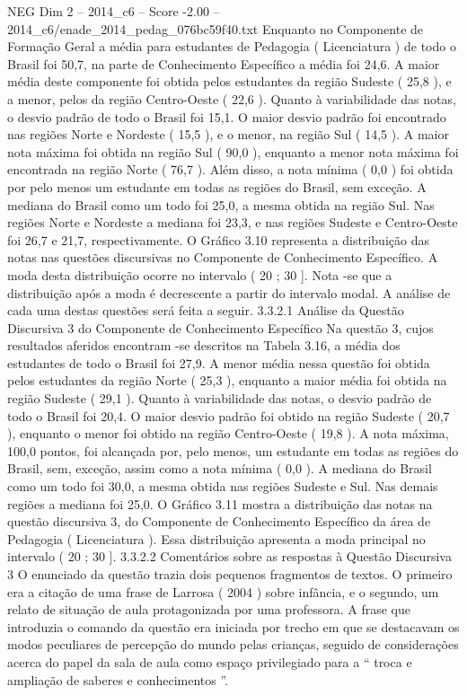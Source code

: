 \begin{textsample}{NEG Dim 2 – 2014\_c6 – Score -2.00 – 2014\_c6/enade\_2014\_pedag\_076bc59f40.txt}
Enquanto no Componente de Formação Geral a média para estudantes de Pedagogia ( Licenciatura ) de todo o Brasil foi 50,7, na parte de Conhecimento Específico a média foi 24,6.
A maior média deste componente foi obtida pelos estudantes da região Sudeste ( 25,8 ), e a menor, pelos da região Centro-Oeste ( 22,6 ).
Quanto à variabilidade das notas, o desvio padrão de todo o Brasil foi 15,1.
O maior desvio padrão foi encontrado nas regiões Norte e Nordeste ( 15,5 ), e o menor, na região Sul ( 14,5 ).
A maior nota máxima foi obtida na região Sul ( 90,0 ), enquanto a menor nota máxima foi encontrada na região Norte ( 76,7 ).
Além disso, a nota mínima ( 0,0 ) foi obtida por pelo menos um estudante em todas as regiões do Brasil, sem exceção.
A mediana do Brasil como um todo foi 25,0, a mesma obtida na região Sul.
Nas regiões Norte e Nordeste a mediana foi 23,3, e nas regiões Sudeste e Centro-Oeste foi 26,7 e 21,7, respectivamente.
O Gráfico 3.10 representa a distribuição das notas nas questões discursivas no Componente de Conhecimento Específico.
A moda desta distribuição ocorre no intervalo ( 20 ; 30 ].
Nota -se que a distribuição após a moda é decrescente a partir do intervalo modal.
A análise de cada uma destas questões será feita a seguir. 3.3.2.1 Análise da Questão Discursiva 3 do Componente de Conhecimento Específico Na questão 3, cujos resultados aferidos encontram -se descritos na Tabela 3.16, a média dos estudantes de todo o Brasil foi 27,9.
A menor média nessa questão foi obtida pelos estudantes da região Norte ( 25,3 ), enquanto a maior média foi obtida na região Sudeste ( 29,1 ).
Quanto à variabilidade das notas, o desvio padrão de todo o Brasil foi 20,4.
O maior desvio padrão foi obtido na região Sudeste ( 20,7 ), enquanto o menor foi obtido na região Centro-Oeste ( 19,8 ).
A nota máxima, 100,0 pontos, foi alcançada por, pelo menos, um estudante em todas as regiões do Brasil, sem, exceção, assim como a nota mínima ( 0,0 ).
A mediana do Brasil como um todo foi 30,0, a mesma obtida nas regiões Sudeste e Sul.
Nas demais regiões a mediana foi 25,0.
O Gráfico 3.11 mostra a distribuição das notas na questão discursiva 3, do Componente de Conhecimento Específico da área de Pedagogia ( Licenciatura ).
Essa distribuição apresenta a moda principal no intervalo ( 20 ; 30 ]. 3.3.2.2 Comentários sobre as respostas à Questão Discursiva 3 O enunciado da questão trazia dois pequenos fragmentos de textos.
O primeiro era a citação de uma frase de Larrosa ( 2004 ) sobre infância, e o segundo, um relato de situação de aula protagonizada por uma professora.
A frase que introduzia o comando da questão era iniciada por trecho em que se destacavam os modos peculiares de percepção do mundo pelas crianças, seguido de considerações acerca do papel da sala de aula como espaço privilegiado para a “ troca e ampliação de saberes e conhecimentos ”.

\end{textsample}
